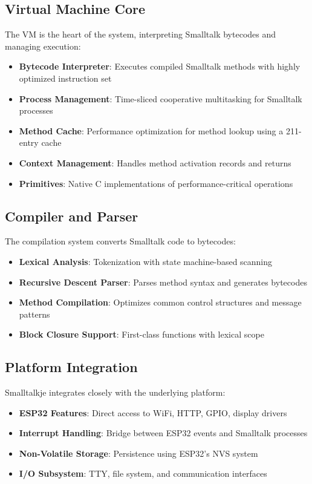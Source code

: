 \documentclass[12pt,a4paper]{report}
\begin{document}
\subsection{Virtual Machine Core}
The VM is the heart of the system, interpreting Smalltalk bytecodes and managing execution:

\begin{itemize}
    \item \textbf{Bytecode Interpreter}: Executes compiled Smalltalk methods with highly optimized instruction set
    \item \textbf{Process Management}: Time-sliced cooperative multitasking for Smalltalk processes
    \item \textbf{Method Cache}: Performance optimization for method lookup using a 211-entry cache
    \item \textbf{Context Management}: Handles method activation records and returns
    \item \textbf{Primitives}: Native C implementations of performance-critical operations
\end{itemize}

\subsection{Compiler and Parser}
The compilation system converts Smalltalk code to bytecodes:

\begin{itemize}
    \item \textbf{Lexical Analysis}: Tokenization with state machine-based scanning
    \item \textbf{Recursive Descent Parser}: Parses method syntax and generates bytecodes
    \item \textbf{Method Compilation}: Optimizes common control structures and message patterns
    \item \textbf{Block Closure Support}: First-class functions with lexical scope
\end{itemize}

\subsection{Platform Integration}
Smalltalkje integrates closely with the underlying platform:

\begin{itemize}
    \item \textbf{ESP32 Features}: Direct access to WiFi, HTTP, GPIO, display drivers
    \item \textbf{Interrupt Handling}: Bridge between ESP32 events and Smalltalk processes
    \item \textbf{Non-Volatile Storage}: Persistence using ESP32's NVS system
    \item \textbf{I/O Subsystem}: TTY, file system, and communication interfaces
\end{itemize}
\end{document}
